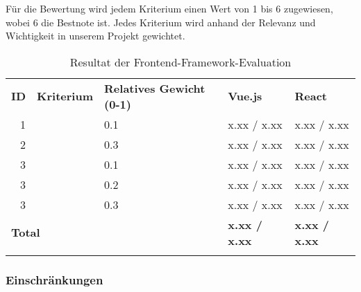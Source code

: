 Für die Bewertung wird jedem Kriterium einen Wert von 1 bis 6 zugewiesen, wobei 6 die Bestnote ist.
Jedes Kriterium wird anhand der Relevanz und Wichtigkeit in unserem Projekt gewichtet.

\begin{longtable}{r l p{3cm} l l}
    \toprule
    \textbf{ID} &
        \textbf{Kriterium} 
                                                    & \textbf{Relatives Gewicht (0-1)} &
                                                                                  \textbf{Vue.js} &
                                                                                                  \textbf{React} \\
    1     & \nameref{Analyse Framework:Funktionsumfang}           & 0.1           & x.xx / x.xx   & x.xx / x.xx  \\
    2     & \nameref{Analyse Framework:Integration Leaflet}       & 0.3           & x.xx / x.xx   & x.xx / x.xx  \\
    3     & \nameref{Analyse Framework:Integration Vector Tiles}  & 0.1           & x.xx / x.xx   & x.xx / x.xx  \\
    3     & \nameref{Analyse Framework:Bedienung}                 & 0.2           & x.xx / x.xx   & x.xx / x.xx  \\
    3     & \nameref{Analyse Framework:Tooling}                   & 0.3           & x.xx / x.xx   & x.xx / x.xx  \\
    \bottomrule
    \multicolumn{3}{l}{\textbf{Total}}                                            & \textbf{x.xx / x.xx}
                                                                                            & \textbf{x.xx / x.xx} \\
    \caption{Resultat der Frontend-Framework-Evaluation}
    \label{table:Resultat der Frontend-Framework-Evaluation}
\end{longtable}


\subsubsection{Einschränkungen}
\label{Analyse:Einschränkungen}


